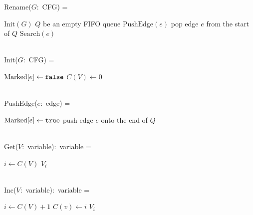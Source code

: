
Rename($G$:~CFG) =
\begin{myalgorithmic}
\STATE $\text{Init}(G)$
\LET $Q$ be an empty FIFO queue
      \EMPTYLINE
{}
 \STATE $\text{PushEdge}(e)$
\ENDFOR
{}
 \STATE pop edge $e$ from the start of $Q$
 \STATE $\text{Search}(e)$
 \ENDWHILE
\end{myalgorithmic}
~\\
Init($G$:~CFG) =
\begin{myalgorithmic}
 \STATE $\text{Marked}[e] \gets \texttt{false}$
\ENDFOR
{}
 \STATE $C(V) \gets 0$
\ENDFOR
\end{myalgorithmic}
~\\
PushEdge($e$:~edge) =
\begin{myalgorithmic}
 \STATE $\text{Marked}[e] \gets \texttt{true}$
 \STATE push edge $e$ onto the end of $Q$
\ENDIF
\end{myalgorithmic}
~\\
Get($V$:~variable):~variable =
\begin{myalgorithmic}
\STATE $i \gets C(V)$
\RETURN $V_i$
\end{myalgorithmic}
~\\
Inc($V$:~variable):~variable =
\begin{myalgorithmic}
\STATE $i \gets C(V) + 1$
\STATE $C(v) \gets i$
\RETURN $V_i$
\end{myalgorithmic}
